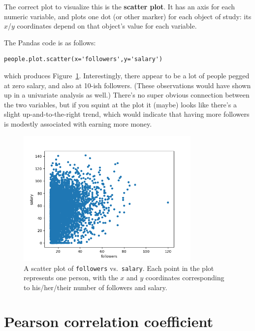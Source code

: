 The correct plot to visualize this is the \textbf{scatter plot}. It has an
axis for each numeric variable, and plots one dot (or other marker) for each
object of study: its $x$/$y$ coordinates depend on that object's value for each
variable.

The Pandas code is as follows:

\begin{Verbatim}[fontsize=\small,samepage=true,frame=single,framesep=3mm]
people.plot.scatter(x='followers',y='salary')
\end{Verbatim}

which produces Figure~\ref{fig:followersSalary}. Interestingly, there appear to
be a lot of people pegged at zero salary, and also at 10-ish followers. (These
observations would have shown up in a univariate analysis as well.) There's no
super obvious connection between the two variables, but if you squint at the
plot it (maybe) looks like there's a slight up-and-to-the-right trend, which
would indicate that having more followers is modestly associated with earning
more money.

\begin{figure}[ht]
\centering
\includegraphics[width=0.8\textwidth]{followersSalary.png}
\caption{A scatter plot of \texttt{followers} vs.~\texttt{salary}. Each point
in the plot represents one person, with the $x$ and $y$ coordinates
corresponding to his/her/their number of followers and salary.}
\label{fig:followersSalary}
\end{figure}

\section{Pearson correlation coefficient}

